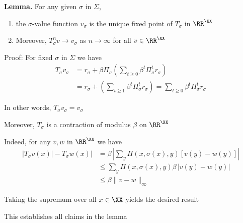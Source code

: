 \begin{frame}
    
    \textbf{Lemma.} For any given $\sigma$ in $\Sigma$,
    \begin{enumerate}
        \item the $\sigma$-value function $v_\sigma$ is the unique fixed point of $T_\sigma$ in $\RR^\XX$
        \item Moreover, $T_\sigma^n v \to v_\sigma$ as $n \to \infty$ for all $v \in \RR^\XX$
    \end{enumerate}
    
    Proof: For fixed $\sigma$ in $\Sigma$ we have
    \begin{align*}
        T_\sigma v_\sigma
        & = r_\sigma +
        \beta \Pi_\sigma 
        \left(
            \sum_{t \geq 0} \beta^t \Pi^t_\sigma r_\sigma
        \right)
        \\
        & = r_\sigma +
        \left(
            \sum_{t \geq 1} \beta^t \Pi^t_\sigma r_\sigma
        \right)
        = \sum_{t \geq 0} \beta^t \Pi^t_\sigma r_\sigma
    \end{align*}

    In other words, $T_\sigma v_\sigma = v_\sigma$

\end{frame}


\begin{frame}
    
    Moreover, $T_\sigma$ is a contraction of modulus $\beta$ on $\RR^\XX$

    Indeed, for any $v, w$ in $\RR^\XX$ we have
    \begin{align*}
        |T_\sigma v(x)| -T_\sigma w(x)|
        & =
        \beta \,
        \left| 
        \sum_y \Pi(x, \sigma(x), y) [ v(y) -  w(y)]
        \right|
        \\
        & \leq 
        \sum_y \Pi(x, \sigma(x), y)
        \beta \,
        \left| 
             v(y) -  w(y)
        \right|
        \\
        & \leq \beta \| v - w\|_\infty
    \end{align*}

    Taking the supremum over all $x \in \XX$ yields the desired result

    This establishes all claims in the lemma

\end{frame}


